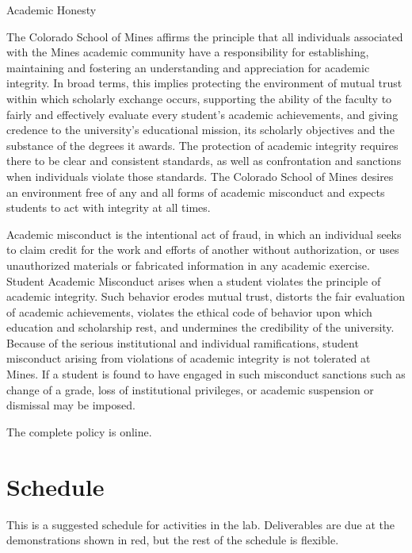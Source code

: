 \begin{frame}{Academic Honesty}

The Colorado School of Mines affirms the principle that all individuals associated with the Mines academic community have a responsibility for establishing, maintaining and fostering an understanding and appreciation for academic integrity. In broad terms, this implies protecting the environment of mutual trust within which scholarly exchange occurs, supporting the ability of the faculty to fairly and effectively evaluate every student's academic achievements, and giving credence to the university's educational mission, its scholarly objectives and the substance of the degrees it awards. The protection of academic integrity requires there to be clear and consistent standards, as well as confrontation and sanctions when individuals violate those standards. The Colorado School of Mines desires an environment free of any and all forms of academic misconduct and expects students to act with integrity at all times.  

Academic misconduct is the intentional act of fraud, in which an individual seeks to claim credit for the work and efforts of another without authorization, or uses unauthorized materials or fabricated information in any academic exercise. Student Academic Misconduct arises when a student violates the principle of academic integrity. Such behavior erodes mutual trust, distorts the fair evaluation of academic achievements, violates the ethical code of behavior upon which education and scholarship rest, and undermines the credibility of the university. Because of the serious institutional and individual ramifications, student misconduct arising from violations of academic integrity is not tolerated at Mines. If a student is found to have engaged in such misconduct sanctions such as change of a grade, loss of institutional privileges, or academic suspension or dismissal may be imposed.

The complete policy is online.
  
\end{frame}

\newpage
\section{Schedule} 

This is a suggested schedule for activities in the lab. Deliverables are due at the demonstrations shown in red, but the rest of the schedule is flexible.

